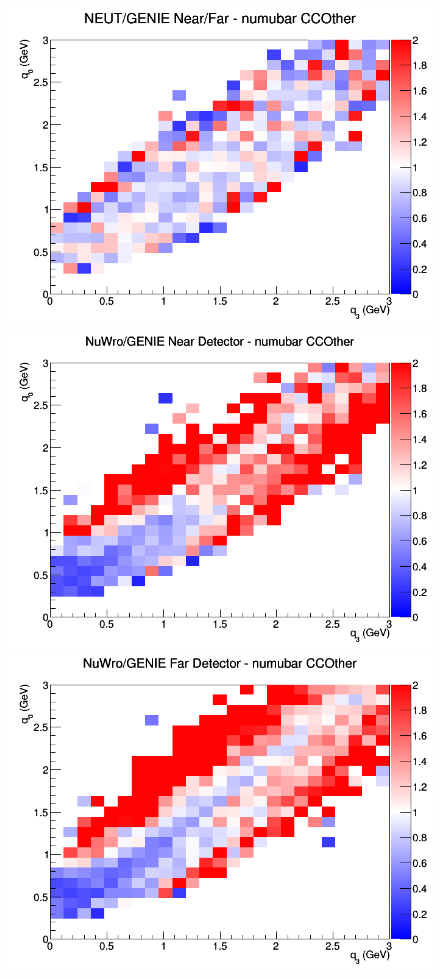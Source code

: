 \begin{figure}[h]
\endminipage
{}
\includegraphics[width=\linewidth]{eff_q0_q3/GAr/ratios/CCOther_NEUT_GENIE_numubar_NF_q3_q0.png}
\endminipage
\newline
{}
\includegraphics[width=\linewidth]{eff_q0_q3/GAr/ratios/CCOther_NuWro_GENIE_numubar_near_q3_q0.png}
\endminipage
{}
\includegraphics[width=\linewidth]{eff_q0_q3/GAr/ratios/CCOther_NuWro_GENIE_numubar_far_q3_q0.png}

\end{figure}
